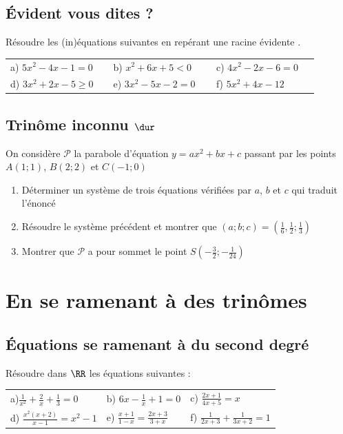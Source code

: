 \documentclass[oneside,12pt]{book}          %
\begin{document}
\subsection{Évident vous dites ?}
Résoudre les (in)équations suivantes en repérant une \og racine évidente \fg.

\begin{tabular}{p{0.3\linewidth}p{0.3\linewidth}p{0.3\linewidth}}
	a) $5x^2-4x-1=0$ & b) $x^2+6x+5<0$ & c) $4x^2-2x-6=0$\\
	d) $3x^2+2x-5\geq0$ & e) $3x^2-5x-2=0$ & f) $5x^2+4x-12$
\end{tabular}



\subsection{Trinôme inconnu $\dur$}
On considère $\mathscr{P}$ la parabole d'équation $y=ax^{2}+bx+c$ passant par les points $A(1;1)$, $B(2;2)$ et $C(-1;0)$
\begin{enumerate}
    \item Déterminer un système de trois équations vérifiées par $a$, $b$ et $c$ qui traduit l'énoncé
    \item Résoudre le système précédent et montrer que $(a;b;c) = (\frac{1}{6},\frac{1}{2};\frac{1}{3})$
    \item Montrer que $\mathscr{P}$ a pour sommet le point $S(-\frac{3}{2};-\frac{1}{24})$
\end{enumerate}



\section{En se ramenant à des trinômes}

\subsection{Équations se ramenant à du second degré}
Résoudre dans $\RR$ les équations suivantes :\\
\renewcommand{\arraystretch}{1.7}
\begin{tabular}{p{} p{} p{} }
    a)$\frac{1}{x^{2}}+\frac{2}{x}+\frac{1}{3}=0$ &  b) $6x -\frac{1}{x} + 1 = 0 $ &c) $\frac{2x+1}{4x+5}= x$ \\
    d) $\frac{x^{2}(x+2)}{x-1}= x^{2}-1$ & e) $\frac{x+1}{1-x}= \frac{2x+3}{3+x}$ & f) $\frac{1}{2x+3}+ \frac{1}{3x+2}=1$ \\    
\end{tabular}
\end{document}
